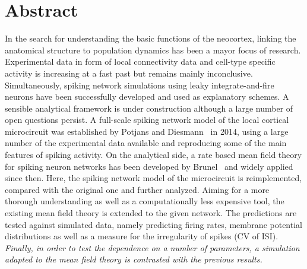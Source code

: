\section{Abstract}
\label{abstract}
In the search for understanding the basic functions of the neocortex, 
linking the anatomical structure to population dynamics has been a mayor
focus of research. Experimental data in form of local connectivity data
and cell-type specific activity is increasing at a fast past but remains
mainly inconclusive. Simultaneously, spiking network simulations using 
leaky integrate-and-fire neurons 
have been successfully developed and used as 
explanatory schemes. 
A sensible analytical framework is under construction although a 
large number of open questions persist. 
A full-scale spiking network model of the local cortical microcircuit
was established by Potjans and Diesmann~\cite{potjans2014} in 2014, 
using a large number of the experimental data available and reproducing
some of the main features of spiking activity. 
On the analytical side, a rate based mean field theory for spiking neuron
networks has been developed by Brunel~\cite{brunel2000} 
and widely applied since then. 
Here, the spiking network model of the microcircuit is reimplemented, 
compared with the original one and further analyzed.
Aiming for a more thorough understanding as well as a computationally less
expensive tool, the existing mean field theory is extended to the given network. 
The predictions are tested against simulated data, namely predicting 
firing rates, membrane potential distributions as well as a measure 
for the irregularity of spikes (CV of ISI). \emph{Finally, in order to test 
the dependence on a number of parameters, a simulation adapted to the 
mean field theory is contrasted with the previous results.}
